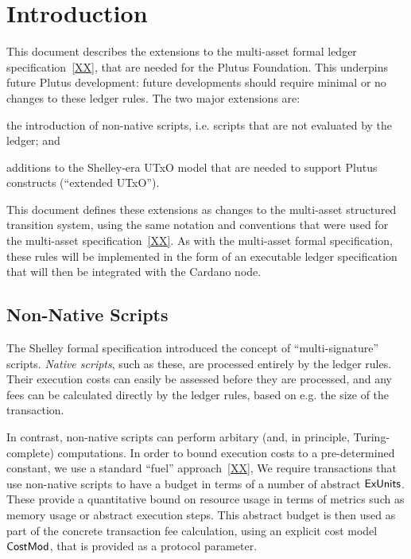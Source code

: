 \section{Introduction}

This document describes the extensions to the multi-asset formal ledger specification~\ref{XX},
that are needed for the Plutus Foundation.  This underpins future Plutus development: future developments should require minimal or no changes to these ledger rules.
%
The two major extensions are:
\begin{inparaenum}
\item
the introduction
of non-native scripts, i.e. scripts that are not evaluated by the ledger; and
\item
  additions to the Shelley-era UTxO model that are needed to support Plutus
  constructs (``extended UTxO'').
\end{inparaenum}
This document defines these extensions as changes to the multi-asset structured transition system,
using the same notation and conventions that were used for the multi-asset specification~\ref{XX}.
As with the multi-asset formal specification, these rules will be implemented in the form of an executable ledger specification that will then be
integrated with the Cardano node.

\subsection{Non-Native Scripts}

The Shelley formal specification introduced the concept of ``multi-signature'' scripts.
\emph{Native scripts}, such as these, are processed entirely by the ledger rules.
Their execution costs can easily be assessed before they are processed,
and any fees can be calculated directly by the ledger rules, based on e.g. the
size of the transaction.

In contrast, non-native scripts can perform arbitary
(and, in principle, Turing-complete) computations.
In order to bound execution costs to a pre-determined constant, we use a standard ``fuel'' approach~\ref{XX},
We require transactions that use non-native scripts
to have a budget in terms of a number of abstract $\mathsf{ExUnits}$.
These provide a quantitative bound on resource usage in terms of metrics such as memory usage or abstract execution steps.
This abstract budget is then used as part of the concrete transaction fee calculation, using an explicit
cost model $\mathsf{CostMod}$, that is provided as a protocol parameter.

